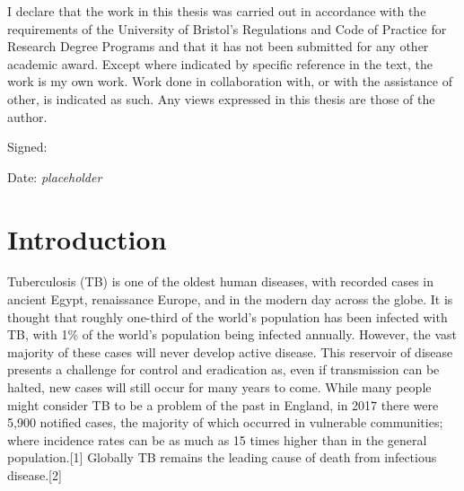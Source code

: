 \documentclass[11pt,twoside]{bristolthesis}
\begin{document}
      \begin{declaration}
      I declare that the work in this thesis was carried out in accordance with the requirements of the University of Bristol's Regulations and Code of Practice for Research Degree Programs and that it has not been submitted for any other academic award. Except where indicated by specific reference in the text, the work is my own work. Work done in collaboration with, or with the assistance of other, is indicated as such. Any views expressed in this thesis are those of the author.
      
      \par
      
      Signed:
      
      \par
      
      Date: \emph{placeholder}
    \end{declaration}
      \hypersetup{linkcolor=black}
    \setcounter{tocdepth}{2}
    \tableofcontents
  
      \listoftables
  
      \listoffigures
  


  \mainmatter %
  \pagestyle{fancyplain} %

  \hypertarget{introduction}{%
  \chapter{Introduction}\label{introduction}}
  
  Tuberculosis (TB) is one of the oldest human diseases, with recorded cases in ancient Egypt, renaissance Europe, and in the modern day across the globe. It is thought that roughly one-third of the world's population has been infected with TB, with 1\% of the world's population being infected annually. However, the vast majority of these cases will never develop active disease. This reservoir of disease presents a challenge for control and eradication as, even if transmission can be halted, new cases will still occur for many years to come. While many people might consider TB to be a problem of the past in England, in 2017 there were 5,900 notified cases, the majority of which occurred in vulnerable communities; where incidence rates can be as much as 15 times higher than in the general population.{[}1{]} Globally TB remains the leading cause of death from infectious disease.{[}2{]}
  
\end{document}
